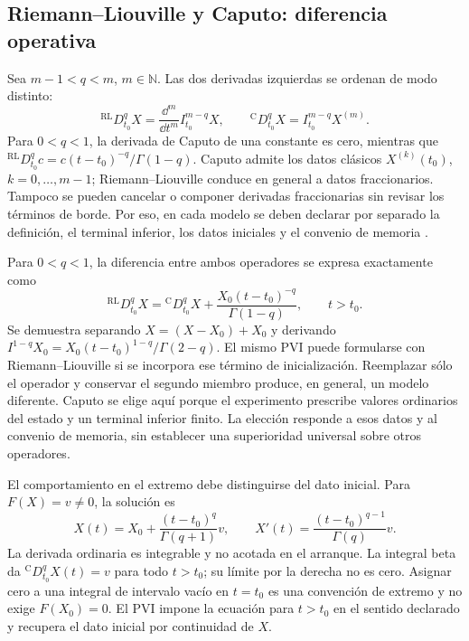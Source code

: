 \subsection{Riemann--Liouville y Caputo: diferencia operativa}

Sea \(m-1<q<m\), \(m\in\mathbb N\). Las dos derivadas izquierdas se ordenan de
modo distinto:
\begin{equation}
 {}^{\mathrm{RL}}D_{t_0}^{q}X
 =\frac{\dd^m}{\dd t^m}I_{t_0}^{m-q}X,
 \qquad
 {}^{\mathrm C}D_{t_0}^{q}X
 =I_{t_0}^{m-q}X^{(m)}.
 \label{eq:rl-caputo-general}
\end{equation}
Para \(0<q<1\), la derivada de Caputo de una constante es cero, mientras que
\({}^{\mathrm{RL}}D_{t_0}^{q}c=
c(t-t_0)^{-q}/\Gamma(1-q)\). Caputo admite los datos clásicos
\(X^{(k)}(t_0)\), \(k=0,\ldots,m-1\); Riemann--Liouville conduce en general a
datos fraccionarios. Tampoco se pueden cancelar o componer derivadas
fraccionarias sin revisar los términos de borde. Por eso, en cada modelo se
deben declarar por separado la definición, el terminal inferior, los datos
iniciales y el convenio de memoria
\cite{Podlubny1999,Monje2010}.

Para $0<q<1$, la diferencia entre ambos operadores se expresa exactamente como
\begin{equation}
 {}^{\mathrm{RL}}D_{t_0}^qX
 ={}^{\mathrm C}D_{t_0}^qX+
 \frac{X_0(t-t_0)^{-q}}{\Gamma(1-q)},\qquad t>t_0.
 \label{eq:rl-caputo-initial-bridge}
\end{equation}
Se demuestra separando $X=(X-X_0)+X_0$ y derivando
$I^{1-q}X_0=X_0(t-t_0)^{1-q}/\Gamma(2-q)$.
El mismo PVI puede formularse con Riemann--Liouville si se incorpora ese
término de inicialización. Reemplazar sólo el operador y conservar el
segundo miembro produce, en general, un modelo diferente. Caputo se elige
aquí porque el experimento prescribe valores ordinarios del estado y un
terminal inferior finito. La elección responde a esos datos y al convenio
de memoria, sin establecer una superioridad universal sobre otros operadores.

El comportamiento en el extremo debe distinguirse del dato inicial.
Para $F(X)=v\ne0$, la solución es
\begin{equation}
 X(t)=X_0+\frac{(t-t_0)^q}{\Gamma(q+1)}v,
 \qquad X'(t)=\frac{(t-t_0)^{q-1}}{\Gamma(q)}v.
 \label{eq:caputo-initial-endpoint}
\end{equation}
La derivada ordinaria es integrable y no acotada en el arranque.
La integral beta da ${}^{\mathrm C}D_{t_0}^qX(t)=v$ para todo $t>t_0$;
su límite por la derecha no es cero. Asignar cero a una integral de
intervalo vacío en $t=t_0$ es una convención de extremo y no exige
$F(X_0)=0$. El PVI impone la ecuación para $t>t_0$ en el sentido declarado
y recupera el dato inicial por continuidad de $X$.

